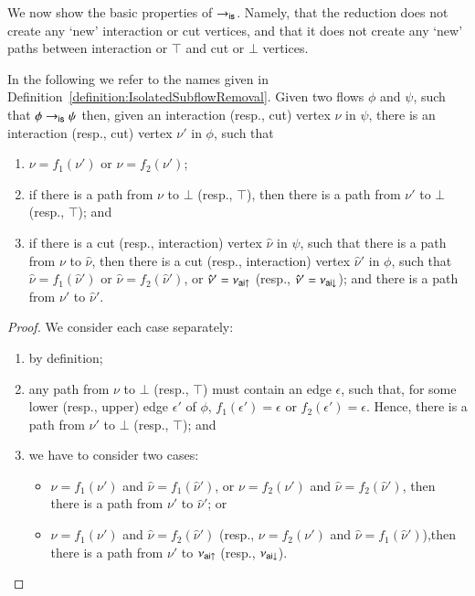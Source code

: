 We now show the basic properties of $\to_{\mathsf{is}}$. Namely, that the reduction does not create any `new' interaction or cut vertices, and that it does not create any `new' paths between interaction or $\top$ and cut or $\bot$ vertices.



\begin{lemma}\label{lemma:IsolatedSubflowRemovalPaths}
In the following we refer to the names given in Definition~\vref{definition:IsolatedSubflowRemoval}.
Given two flows $\phi$ and $\psi$, such that $\phi\to_{\mathsf{is}}\psi$ then, given an interaction (resp., cut) vertex $\nu$ in $\psi$, there is an interaction (resp., cut) vertex $\nu'$ in $\phi$, such that
\begin{enumerate}
\item $\nu=f_1(\nu')$ or $\nu=f_2(\nu')$;
\item if there is a path from $\nu$ to $\bot$ (resp., $\top$), then there is a path from $\nu'$ to $\bot$ (resp., $\top$); and
\item if there is a cut (resp., interaction) vertex $\hat\nu$ in $\psi$, such that there is a path from $\nu$ to $\hat\nu$, then there is a cut (resp., interaction) vertex $\hat\nu'$ in $\phi$, such that $\hat\nu=f_1(\hat\nu')$ or $\hat\nu=f_2(\hat\nu')$, or $\hat\nu'=\nu_{{\mathsf{ai}}{\uparrow}}$ (resp., $\hat\nu'=\nu_{{\mathsf{ai}}{\downarrow}}$); and there is a path from $\nu'$ to $\hat\nu'$.
\end{enumerate}
\end{lemma}

\begin{proof}
We consider each case separately:
\begin{enumerate}
 \item by definition;
 \item any path from $\nu$ to $\bot$ (resp., $\top$) must contain an edge $\epsilon$, such that, for some lower (resp., upper) edge $\epsilon'$ of $\phi$, $f_1(\epsilon')=\epsilon$ or $f_2(\epsilon')=\epsilon$. Hence, there is a path from $\nu'$ to $\bot$ (resp., $\top$); and
 \item we have to consider two cases:
 \begin{itemize}
  \item $\nu=f_1(\nu')$ and $\hat\nu=f_1(\hat\nu')$, or $\nu=f_2(\nu')$ and $\hat\nu=f_2(\hat\nu')$, then there is a path from $\nu'$ to $\hat\nu'$; or
  \item $\nu=f_1(\nu')$ and $\hat\nu=f_2(\hat\nu')$ (resp., $\nu=f_2(\nu')$ and $\hat\nu=f_1(\hat\nu')$),then there is a path from $\nu'$ to $\nu_{{\mathsf{ai}}{\uparrow}}$ (resp., $\nu_{{\mathsf{ai}}{\downarrow}}$).
 \end{itemize}
\end{enumerate}
\end{proof}

